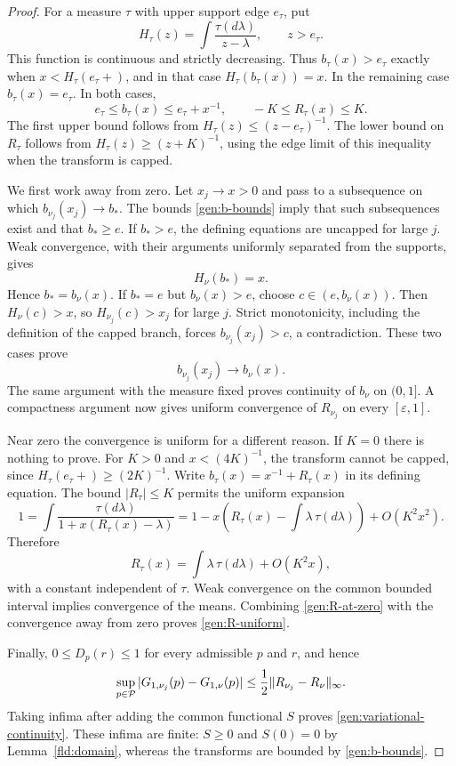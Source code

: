 \begin{proof}
For a measure $\tau$ with upper support edge $e_\tau$, put
\[
 H_\tau(z)=\int\frac{\tau(d\lambda)}{z-\lambda},
 \qquad z>e_\tau.
\]
This function is continuous and strictly decreasing.  Thus
$b_\tau(x)>e_\tau$ exactly when $x<H_\tau(e_\tau+)$, and in that
case $H_\tau(b_\tau(x))=x$.  In the remaining case
$b_\tau(x)=e_\tau$.  In both cases,
\begin{equation}\label{gen:b-bounds}
 e_\tau\le b_\tau(x)\le e_\tau+x^{-1},
 \qquad -K\le R_\tau(x)\le K.
\end{equation}
The first upper bound follows from
$H_\tau(z)\le(z-e_\tau)^{-1}$.  The lower bound on $R_\tau$
follows from $H_\tau(z)\ge(z+K)^{-1}$, using the edge limit of this
inequality when the transform is capped.

We first work away from zero.  Let $x_j\to x>0$ and pass to a
subsequence on which $b_{\nu_j}(x_j)\to b_*$.  The bounds
\eqref{gen:b-bounds} imply that such subsequences exist and that
$b_*\ge e$.  If $b_*>e$, the defining equations are uncapped for
large $j$.  Weak convergence, with their arguments uniformly separated
from the supports, gives
\[
 H_\nu(b_*)=x.
\]
Hence $b_*=b_\nu(x)$.  If $b_*=e$ but $b_\nu(x)>e$, choose
$c\in(e,b_\nu(x))$.  Then $H_\nu(c)>x$, so
$H_{\nu_j}(c)>x_j$ for large $j$.  Strict monotonicity, including the
definition of the capped branch, forces $b_{\nu_j}(x_j)>c$, a
contradiction.  These two cases prove
\[
 b_{\nu_j}(x_j)\longrightarrow b_\nu(x).
\]
The same argument with the measure fixed proves continuity of
$b_\nu$ on $(0,1]$.  A compactness argument now gives uniform
convergence of $R_{\nu_j}$ on every $[\varepsilon,1]$.

Near zero the convergence is uniform for a different reason.  If $K=0$
there is nothing to prove.  For $K>0$ and $x<(4K)^{-1}$, the transform
cannot be capped, since
$H_\tau(e_\tau+)\ge(2K)^{-1}$.  Write
$b_\tau(x)=x^{-1}+R_\tau(x)$ in its defining equation.  The bound
$|R_\tau|\le K$ permits the uniform expansion
\[
 1=\int\frac{\tau(d\lambda)}{1+x(R_\tau(x)-\lambda)}
  =1-x\left(R_\tau(x)-\int\lambda\,\tau(d\lambda)\right)
    +O(K^2x^2).
\]
Therefore
\begin{equation}\label{gen:R-at-zero}
 R_\tau(x)=\int\lambda\,\tau(d\lambda)+O(K^2x),
\end{equation}
with a constant independent of $\tau$.  Weak convergence on the common
bounded interval implies convergence of the means.  Combining
\eqref{gen:R-at-zero} with the convergence away from zero proves
\eqref{gen:R-uniform}.

Finally, $0\le D_p(r)\le1$ for every admissible $p$ and $r$, and hence
\[
 \sup_{p\in\mathcal P}|G_{1,\nu_j}(p)-G_{1,\nu}(p)|
 \le\frac12\|R_{\nu_j}-R_\nu\|_\infty.
\]
Taking infima after adding the common functional $S$ proves
\eqref{gen:variational-continuity}.  These infima are finite: $S\ge0$
and $S(0)=0$ by Lemma~\ref{fld:domain}, whereas the transforms are
bounded by \eqref{gen:b-bounds}.
\end{proof}


